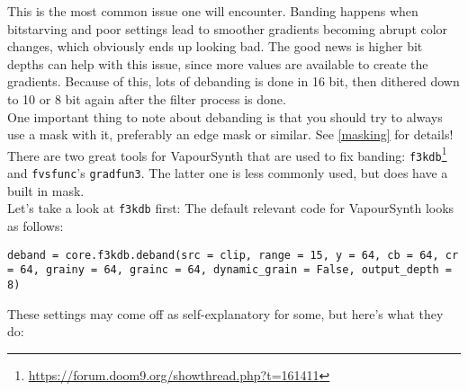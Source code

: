 \documentclass{scrartcl}
\begin{document}
This is the most common issue one will encounter.  Banding happens when bitstarving and poor settings lead to smoother gradients becoming abrupt color changes, which obviously ends up looking bad.  The good news is higher bit depths can help with this issue, since more values are available to create the gradients.  Because of this, lots of debanding is done in 16 bit, then dithered down to 10 or 8 bit again after the filter process is done.\\
One important thing to note about debanding is that you should try to always use a mask with it, preferably an edge mask or similar.  See \ref{masking} for details!\\
There are two great tools for VapourSynth that are used to fix banding: \texttt{f3kdb}\footnote{\url{https://forum.doom9.org/showthread.php?t=161411}} and \texttt{fvsfunc}'s \texttt{gradfun3}.  The latter one is less commonly used, but does have a built in mask.\\
Let's take a look at \texttt{f3kdb} first:
The default relevant code for VapourSynth looks as follows:
\begin{lstlisting}
deband = core.f3kdb.deband(src = clip, range = 15, y = 64, cb = 64, cr = 64, grainy = 64, grainc = 64, dynamic_grain = False, output_depth = 8)
\end{lstlisting}
These settings may come off as self-explanatory for some, but here's what they do:
\end{document}
